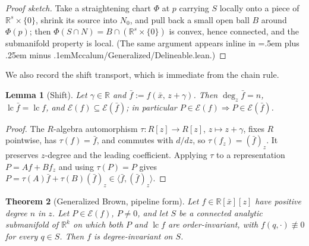 \documentclass[11pt,a4paper]{article}
\newtheorem{theorem}{Theorem}[section]
\newtheorem{lemma}[theorem]{Lemma}
\theoremstyle{definition}
\newcommand{\R}{\mathbb{R}}
\newcommand{\xb}{\bar{x}}
\newcommand{\lc}{\operatorname{lc}}
\newcommand{\E}{\mathcal{E}}
\newcommand{\ideal}[1]{\langle #1\rangle}
\newcommand{\code}[1]{{\ttfamily\spaceskip=.5em plus .25em minus .1em\relax #1}}
\begin{document}
\begin{proof}[Proof sketch]
Take a straightening chart $\Phi$ at $p$ carrying $S$ locally onto a piece of
$\R^s \times \{0\}$, shrink its source into $N_0$, and pull back a small open
ball $B$ around $\Phi(p)$; then $\Phi(S \cap N) = B \cap (\R^s \times \{0\})$ is
convex, hence connected, and the submanifold property is local. (The same
argument appears inline in \code{Mccalum/Generalized/Delineable.lean}.)
\end{proof}

We also record the shift transport, which is immediate from the chain rule.

\begin{lemma}[Shift]\label{lem:shift}
Let $\gamma \in \R$ and $\bar f := f(\xb,\, z + \gamma)$. Then
$\deg_z \bar f = n$, $\lc \bar f = \lc f$, and $\E(f) \subseteq \E(\bar f)$; in
particular $P \in \E(f) \Rightarrow P \in \E(\bar f)$.
\end{lemma}

\begin{proof}
The $R$-algebra automorphism $\tau : R[z] \to R[z]$, $z \mapsto z + \gamma$,
fixes $R$ pointwise, has $\tau(f) = \bar f$, and commutes with $d/dz$, so
$\tau(f_z) = (\bar f)_z$. It preserves $z$-degree and the leading coefficient.
Applying $\tau$ to a representation $P = Af + Bf_z$ and using $\tau(P) = P$
gives $P = \tau(A)\bar f + \tau(B)(\bar f)_z \in \ideal{\bar f, (\bar f)_z}$.
\end{proof}

\begin{theorem}[Generalized Brown, pipeline form]\label{thm:main}
Let $f \in \R[\xb][z]$ have positive degree $n$ in $z$. Let $P \in \E(f)$,
$P \neq 0$, and let $S$ be a connected analytic submanifold of $\R^k$ on which
\emph{both} $P$ \emph{and} $\lc f$ are order-invariant, with
$f(q,\cdot) \not\equiv 0$ for every $q \in S$. Then $f$ is degree-invariant on
$S$.
\end{theorem}
\end{document}
